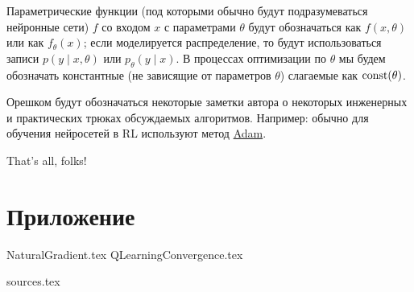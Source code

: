 \documentclass[a4paper, 10pt, oneside]{memoir}
\begin{document}
Параметрические функции (под которыми обычно будут подразумеваться нейронные сети) $f$ со входом $x$ с параметрами $\theta$ будут обозначаться как $f(x, \theta)$ или как $f_{\theta}(x)$; если моделируется распределение, то будут использоваться записи $p(y \mid x, \theta)$ или $p_\theta(y \mid x)$. В процессах оптимизации по $\theta$ мы будем обозначать константные (не зависящие от параметров $\theta$) слагаемые как $\operatorname{const}(\theta)$.

\begin{remark}
Орешком будут обозначаться некоторые заметки автора о некоторых инженерных и практических трюках обсуждаемых алгоритмов. Например: обычно для обучения нейросетей в RL используют метод \href{https://arxiv.org/abs/1412.6980}{Adam}.
\end{remark}

\newpage
\tableofcontents*










\vspace{2cm}
\begin{center}
That's all, folks!
\end{center}

\newpage

\appendix

\chapter{Приложение}

{NaturalGradient.tex}
{QLearningConvergence.tex}

{sources.tex}
\end{document}
